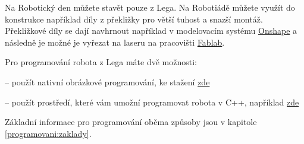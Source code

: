 Na Robotický den můžete stavět pouze z  Lega. 
Na Robotiádě můžete využít do konstrukce například díly z překližky  pro větší tuhost a snazší montáž. 
Překližkové díly se dají navhrnout například v modelovacím systému \href{https://www.onshape.com/}{Onshape}  a následně je možné je vyřezat na laseru na pracovišti \href{https://www.fablabbrno.cz}{Fablab}.

Pro programování robota z Lega máte dvě možnosti: 

-- použít nativní obrázkové programování, ke stažení \href{https://www.lego.com/en-us/mindstorms/downloads}{zde} 

-- použít prostředí, které vám umožní programovat robota v C++, například \href{}{zde} %

Základní informace pro programování oběma způsoby jsou v kapitole \ref{programovani:zaklady}.
 
 


